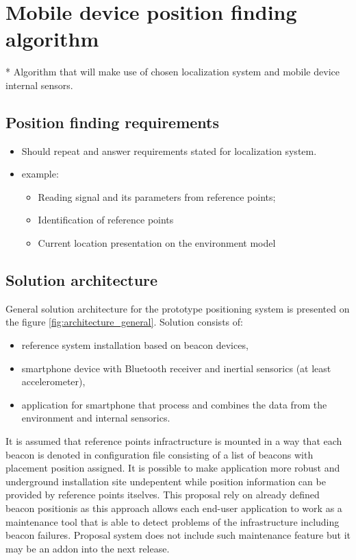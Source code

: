 \documentclass[../main.tex]{subfiles}
\begin{document}
\chapter{Mobile device position finding algorithm}
* Algorithm that will make use of chosen localization system and mobile device internal sensors.

\section{Position finding requirements} %
\label{sec:position_finding_requirements}
\begin{itemize}
	\item Should repeat and answer requirements stated for localization system.
	\item example:
	\begin{itemize}
		\item Reading signal and its parameters from reference points;
		\item Identification of reference points
		\item Current location presentation on the environment model
	\end{itemize}
\end{itemize}



\section{Solution architecture} %
\label{sec:solution_architecture}

General solution architecture for the prototype positioning system is presented on the figure \ref{fig:architecture_general}. Solution consists of:
\begin{itemize}
	\item reference system installation based on beacon devices,
	\item smartphone device with Bluetooth receiver and inertial sensorics (at least accelerometer),
	\item application for smartphone that process and combines the data from the environment and internal sensorics.
\end{itemize}

It is assumed that reference points infractructure is mounted in a way that each beacon is denoted in configuration file consisting of a list of beacons with placement position assigned. It is possible to make application more robust and underground installation site undepentent while position information can be provided by reference points itselves. This proposal rely on already defined beacon positionis as this approach allows each end-user application to work as a maintenance tool that is able to detect problems of the infrastructure including beacon failures. Proposal system does not include such maintenance feature but it may be an addon into the next release.
\end{document}
